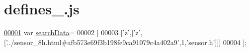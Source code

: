 \hypertarget{defines__14_8js_source}{}\section{defines\+\_.\+js}
\label{defines__14_8js_source}

\begin{DoxyCode}
\hypertarget{defines__14_8js_source.tex_l00001}{}\hyperlink{defines__14_8js_ad01a7523f103d6242ef9b0451861231e}{00001} var \hyperlink{defines__14_8js_ad01a7523f103d6242ef9b0451861231e}{searchData}=
00002 [
00003   [\textcolor{charliteral}{'z'},[\textcolor{charliteral}{'z'},[\textcolor{stringliteral}{'../sensor\_8h.html#afb573e69f3b198fe9ca91079c4a402a9'},1,\textcolor{stringliteral}{'sensor.h'}]]]
00004 ];
\end{DoxyCode}
